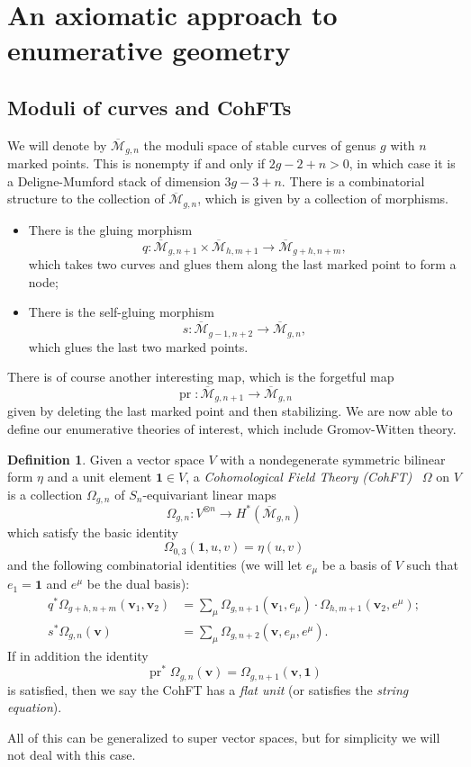 \documentclass[10pt,oldfontcommands,oneside]{memoir}
\theoremstyle{definition}
\newtheorem{defn}[thm]{Definition}
\theoremstyle{remark}
\theoremstyle{plain}
\theoremstyle{definition}
\theoremstyle{remark}
\newcommand{\Mbar}{\overline{\mathcal{M}}}
\newcommand{\mbf}[1]{\mathbf{#1}}
\newcommand{\bv}{\mbf{v}}
\newcommand{\1}{\mathbf{1}}
\newcommand{\2}{\mathbf{2}}
\newcommand{\3}{\mathbf{3}}
\DeclareMathOperator{\pr}{pr}
\begin{document}
\section{An axiomatic approach to enumerative geometry}%
\label{sec:An axiomatic approach to enumerative geometry (Patrick Lei)}

\subsection{Moduli of curves and CohFTs}%
\label{sub:Moduli of curves and CohFTs}

We will denote by $\Mbar_{g,n}$ the moduli space of stable curves of genus $g$ with $n$ marked points. This is nonempty if and only if $2g-2+n > 0$, in which case it is a Deligne-Mumford stack of dimension $3g-3+n$. There is a combinatorial structure to the collection of $\Mbar_{g,n}$, which is given by a collection of morphisms.
\begin{itemize}
    \item There is the gluing morphism 
        \[q \colon \Mbar_{g,n+1} \times \Mbar_{h, m+1} \to \Mbar_{g+h,n+m}, \] 
        which takes two curves and glues them along the last marked point to form a node;
    \item There is the self-gluing morphism \[s \colon \Mbar_{g-1,n+2} \to \Mbar_{g,n},\] 
        which glues the last two marked points.
\end{itemize} 
There is of course another interesting map, which is the forgetful map
\[ \pr \colon \Mbar_{g,n+1} \to \Mbar_{g,n} \]
given by deleting the last marked point and then stabilizing. We are now able to define our enumerative theories of interest, which include Gromov-Witten theory.

\begin{defn}
    Given a vector space $V$ with a nondegenerate symmetric bilinear form $\eta$ and a unit element $\1 \in V$, a \textit{Cohomological Field Theory (CohFT)}~\cite{km94} $\Omega$ on $V$ is a collection $\Omega_{g,n}$ of $S_n$-equivariant linear maps
    \[ \Omega_{g,n} \colon V^{\otimes n} \to H^*(\Mbar_{g,n}) \]
    which satisfy the basic identity
    \[ \Omega_{0,3}(\1, u,v) = \eta(u,v) \]
    and the following combinatorial identities (we will let $e_{\mu}$ be a basis of $V$ such that $e_1 = \1$ and $e^{\mu}$ be the dual basis):
    \begin{align*}
        q^* \Omega_{g+h,n+m}(\bv_1, \bv_2) &= \sum_{\mu} \Omega_{g,n+1}(\bv_1, e_{\mu}) \cdot \Omega_{h,m+1}(  \bv_2, e^{\mu} ); \\
        s^* \Omega_{g,n}(\bv) &= \sum_{\mu} \Omega_{g,n+2}(\bv, e_{\mu}, e^{\mu}).
    \end{align*}
    If in addition the identity
    \[ \pr^*\Omega_{g,n}(\bv) = \Omega_{g,n+1}(\bv,\1) \]
    is satisfied, then we say the CohFT has a \textit{flat unit} (or satisfies the \textit{string equation}).
\end{defn}
All of this can be generalized to super vector spaces, but for simplicity we will not deal with this case.
\end{document}
